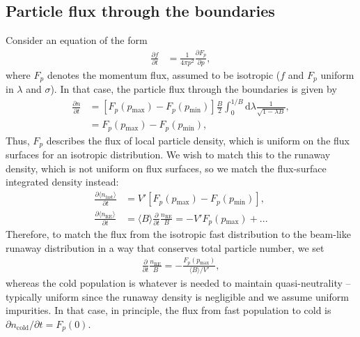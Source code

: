 \documentclass[11pt,a4paper]{article}
\newcommand{\rd}{\ensuremath{\mathrm{d}}}
\newcommand{\sub}[1]{\ensuremath{_{\text{#1}}}}
\begin{document}
\subsection{Particle flux through the boundaries}
Consider an equation of the form
\begin{align}
\frac{\partial f}{\partial t} &= \frac{1}{4\pi p^2}\frac{\partial F_p}{\partial p},
\end{align}
where $F_p$ denotes the momentum flux, assumed to be isotropic ($f$ and $F_p$ uniform in $\lambda$ and $\sigma$). In that case, the particle flux through the boundaries is given by
\begin{align}
\frac{\partial n}{\partial t} &=[F_p(p\sub{max}) - F_p(p\sub{min})]\frac{B}{2} \int_0^{1/B} \rd \lambda \frac{1}{\sqrt{1-\lambda B}}, \nonumber \\
&=F_p(p\sub{max}) - F_p(p\sub{min}),
\end{align}
Thus, $F_p$ describes the flux of local particle density, which is uniform on the flux surfaces for an isotropic distribution. We wish to match this to the runaway density, which is not uniform on flux surfaces, so we match the flux-surface integrated density instead:
\begin{align}
\frac{\partial \langle n\sub{fast} \rangle}{\partial t} &= V'[F_p(p\sub{max}) - F_p(p\sub{min})], \nonumber \\
\frac{\partial \langle n\sub{RE} \rangle}{\partial t} &= \langle B \rangle \frac{\partial}{\partial t}\frac{n\sub{RE}}{B} = -V' F_p(p\sub{max}) + ...
\end{align}
Therefore, to match the flux from the isotropic fast distribution to the beam-like runaway distribution in a way that conserves total particle number, we set
\begin{align}
\frac{\partial}{\partial t}\frac{n\sub{RE}}{B} =  - \frac{F_p(p\sub{max})}{\langle B\rangle/V'} ,
\end{align}
whereas the cold population is whatever is needed to maintain quasi-neutrality -- typically uniform since the runaway density is negligible and we assume uniform impurities. In that case, in principle, the flux from fast population to cold is $\partial n\sub{cold}/\partial t = F_p(0)$.

\end{document}

